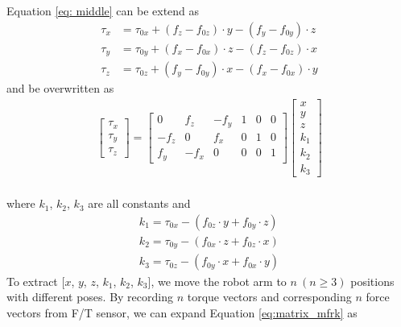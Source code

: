 Equation \ref{eq: middle} can be extend as 
\begin{equation}
\begin{split}
\tau _{x}	&=	\tau _{0x} 	+ \left( f_z - f_{0z}\right) \cdot y - \left( f_y - f_{0y}\right) \cdot z\\
\tau _{y}	&=	\tau _{0y}	+ \left( f_x - f_{0x}\right) \cdot z - \left( f_z - f_{0z}\right) \cdot x\\
\tau _{z}	&=	\tau _{0z}	+ \left( f_y - f_{0y}\right) \cdot x - \left( f_x - f_{0x}\right) \cdot y 
\end{split}
\end{equation}
and be overwritten as
\begin{equation}\label{eq:matrix_mfrk}
\begin{split}
\begin{bmatrix}
\tau _x\\
\tau _y\\
\tau _z
\end{bmatrix}
=
\begin{bmatrix}
0		&f_z	&-f_y	&1	&0	&0\\
-f_z	&0		&f_x	&0	&1	&0\\
f_y		&-f_x	&0		&0	&0	&1
\end{bmatrix}
\begin{bmatrix}
x\\
y\\
z\\
k_1\\
k_2\\
k_3
\end{bmatrix}\\
\end{split}
\end{equation}
\par\noindent
where $k_1$, $k_2$, $k_3$ are all constants and
\begin{equation}\label{eq:k1k2k3}
\begin{split}
k_1 = \tau _{0x} - \left( f_{0z} \cdot y + f_{0y} \cdot z \right)  \\
k_2 = \tau _{0y} - \left( f_{0x} \cdot z + f_{0z} \cdot x \right)  \\
k_3 = \tau _{0z} - \left( f_{0y} \cdot x + f_{0x} \cdot y \right)  
\end{split}
\end{equation}
To extract [$x$, $y$, $z$, $k_1$, $k_2$, $k_3$], we move the robot arm to $n\ (n\geq3)$ positions with different poses. By recording $n$ torque vectors and corresponding $n$ force vectors from F/T sensor, we can expand Equation \ref{eq:matrix_mfrk} as
